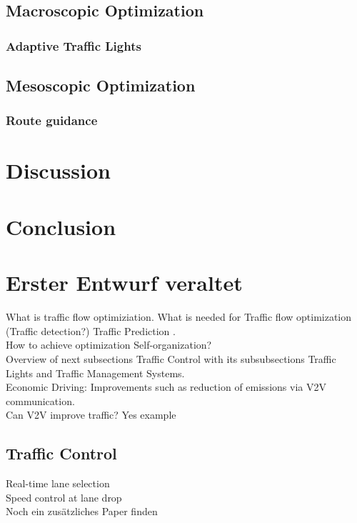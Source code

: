 \documentclass{sig-alternate}
\begin{document}
\subsection{Macroscopic Optimization}
\subsubsection{Adaptive Traffic Lights}

\subsection{Mesoscopic Optimization}
\subsubsection{Route guidance}
\section{Discussion}

\section{Conclusion}




\section{Erster Entwurf veraltet}

What is traffic flow optimiziation. What is needed for Traffic flow optimization (Traffic detection?) Traffic Prediction \cite{6856591}. \\ How to achieve optimization Self-organization?\cite{5625236} \\Overview of next subsections Traffic Control with its subsubsections Traffic Lights and Traffic Management Systems. \\
Economic Driving: Improvements such as reduction of emissions via V2V communication.  \\
Can V2V  improve traffic?  Yes example\cite{6856462}
\subsection{Traffic Control}
Real-time lane selection\cite{6856515} \\
Speed control at lane drop \cite{1614269.1614274}\\
Noch ein zusätzliches Paper finden\\
\end{document}
